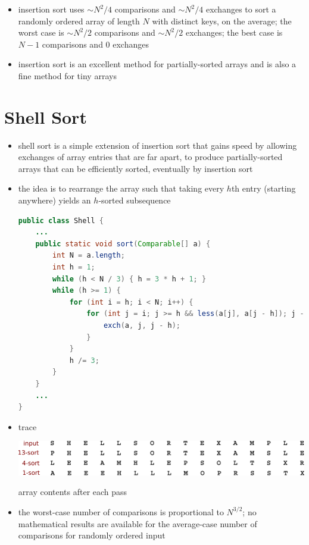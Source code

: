 \documentclass[8pt,a4paper,compress]{beamer}
\begin{document}
\begin{frame}[fragile]
\begin{itemize}
\item insertion sort uses $\sim N^2 /4$ comparisons and $\sim N^2 /4$ exchanges to sort a randomly ordered array of length $N$ with distinct keys, on the average; the worst case is $\sim N^2 /2$ comparisons and $\sim N^2/2$ exchanges; the best case is $N-1$ comparisons and 0 exchanges

\item insertion sort is an excellent method for partially-sorted arrays and is also a fine method for tiny arrays
\end{itemize}
\end{frame}

\section{Shell Sort}
\begin{frame}[fragile]
\begin{itemize}
\item shell sort is a simple extension of insertion sort that gains speed by allowing exchanges of array entries that are far apart, to produce partially-sorted arrays that can be efficiently sorted, eventually by insertion sort

\item the idea is to rearrange the array such that taking every $h$th entry (starting anywhere) yields an $h$-sorted subsequence
\begin{lstlisting}[language=Java]
public class Shell {
    ...
    public static void sort(Comparable[] a) {
        int N = a.length; 
        int h = 1;
        while (h < N / 3) { h = 3 * h + 1; }
        while (h >= 1) {
            for (int i = h; i < N; i++) {
                for (int j = i; j >= h && less(a[j], a[j - h]); j -= h) {
                    exch(a, j, j - h);
                }
            }
            h /= 3;
        }    
    }
    ...
}
\end{lstlisting}
\end{itemize}
\end{frame}

\begin{frame}[fragile]
\begin{itemize}
\item trace

\begin{center}
\includegraphics[scale=0.6]{./figures/shell_trace.pdf}

\smallskip

array contents after each pass
\end{center}

\item the worst-case number of comparisons is proportional to $N^{3/2}$; no mathematical results are available for the average-case number of comparisons for randomly ordered input
\end{itemize}
\end{frame}
\end{document}
